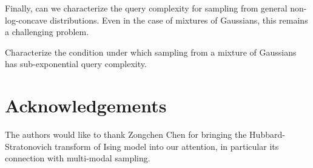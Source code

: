 \documentclass[11pt,a4paper]{article}
\begin{document}
Finally, can we characterize the query complexity for sampling from general non-log-concave distributions. Even in the case of mixtures of Gaussians, this remains a challenging problem.

\begin{problem}
    Characterize the condition under which sampling from a mixture of Gaussians has sub-exponential query complexity.    
\end{problem}



\section*{Acknowledgements}

The authors would like to thank Zongchen Chen for bringing the Hubbard-Stratonovich transform of Ising model into our attention, in particular its connection with multi-modal sampling. 


\appendix

\end{document}
